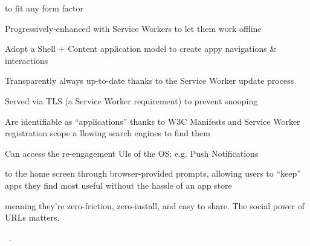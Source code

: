 \begin{description}[leftmargin=0.5cm,style=nextline]
	\item[Responsive] to fit any form factor
	\item[Connectivity independent] Progressively-enhanced with Service Workers to let them work offline
	\item[App-like-interactions] Adopt a Shell + Content application model to create appy navigations \& interactions
	\item[Fresh] Transparently always up-to-date thanks to the Service Worker update process
	\item[Safe] Served via TLS (a Service Worker requirement) to prevent snooping
	\item[Discoverable] Are identifiable as “applications” thanks to W3C Manifests and Service Worker registration scope a llowing search engines to find them
	\item[Re-engageable] Can access the re-engagement UIs of the OS; e.g. Push Notifications
	\item[Installable] to the home screen through browser-provided prompts, allowing users to “keep” apps they find most useful without the hassle of an app store
	\item[Linkable] meaning they’re zero-friction, zero-install, and easy to share. The social power of URLs matters.
\end{description}
~\cite{pwa}.
%
%
